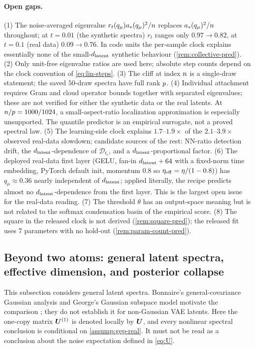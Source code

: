 \paragraph{Open gaps.}
(1) The noise-averaged eigenvalue $r_t(q_\mu)a_*(q_\mu)^2/n$ replaces $a_*(q_\mu)^2/n$ throughout; at $t=0.01$ (the synthetic spectra) $r_t$ ranges only $0.97\to0.82$, at $t=0.1$ (real data) $0.09\to0.76$. In code units the per-sample clock explains essentially none of the small-$d_{\mathrm{latent}}$ synthetic behaviour (\cref{rem:collective-pred}). (2) Only unit-free eigenvalue ratios are used here; absolute step counts depend on the clock convention of \eqref{eq:lin-steps}. (3) The cliff at index $n$ is a single-draw statement; the saved $50$-draw spectra have full rank $p$. (4) Individual attachment requires Gram and cloud operator bounds together with separated eigenvalues; these are not verified for either the synthetic data or the real latents. At $n/p=1000/1024$, a small-aspect-ratio localization approximation is especially unsupported. The quantile predictor is an empirical surrogate, not a proved spectral law. (5) The learning-side clock explains $1.7$--$1.9\times$ of the $2.1$--$3.9\times$ observed real-data slowdown; candidate sources of the rest: NN-ratio detection drift, the $d_{\mathrm{latent}}$-dependence of $\mathcal D_{t_c}$, and a $d_{\mathrm{latent}}$-proportional factor. (6) The deployed real-data first layer (GELU, fan-in $d_{\mathrm{latent}}+64$ with a fixed-norm time embedding, PyTorch default init, momentum $0.8$ so $\eta_{\rm eff}=\eta/(1-0.8)$) has $q_\mu\approx0.36$ nearly independent of $d_{\mathrm{latent}}$; applied literally, the recipe predicts almost no $d_{\mathrm{latent}}$-dependence from the first layer. This is the largest open issue for the real-data reading. (7) The threshold $\theta$ has an output-space meaning but is not related to the softmax condensation basin of the empirical score. (8) The square in the released clock is not derived (\cref{rem:square-pred}); the released fit uses 7 parameters with no hold-out (\cref{rem:param-count-pred}).

\subsection{Beyond two atoms: general latent spectra, effective dimension, and posterior collapse}
\label{app:theory-general}

This subsection considers general latent spectra. Bonnaire's general-covariance Gaussian analysis and George's Gaussian subspace model motivate the comparison \citep{bonnaire2025,george2025dsm}; they do not establish it for non-Gaussian VAE latents. Here the one-copy matrix $\bm{U}^{(1)}$ is denoted locally by $\bm{U}$, and every nonlinear spectral conclusion is conditional on \cref{assump:gep-real}. It must not be read as a conclusion about the noise expectation defined in \cref{eq:U}.

